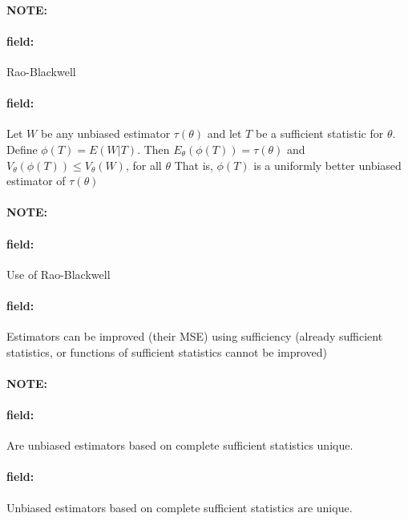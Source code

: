 \documentclass[12pt]{article}
\newenvironment{note}{\paragraph{NOTE:}}{}
\newenvironment{field}{\paragraph{field:}}{}
\begin{document}
\begin{note}
  \begin{field}
    Rao-Blackwell
  \end{field}
  \begin{field}
    Let $W$ be any unbiased estimator $\tau(\theta)$ and let $T$ be a sufficient statistic for $\theta$. Define $\phi(T) = E(W|T)$. Then $E_\theta(\phi(T)) = \tau(\theta)$ and $V_\theta(\phi(T))\leq V_\theta(W)$, for all $\theta$
    That is, $\phi(T)$ is a uniformly better unbiased estimator of $\tau(\theta)$
  \end{field}
\end{note}

\begin{note}
  \begin{field}
    Use of Rao-Blackwell
  \end{field}
  \begin{field}
    Estimators can be improved (their MSE) using sufficiency (already sufficient statistics, or functions of sufficient statistics cannot be improved)
  \end{field}
\end{note}

\begin{note}
  \begin{field}
    Are unbiased estimators based on complete sufficient statistics unique.
  \end{field}
  \begin{field}
    Unbiased estimators based on complete sufficient statistics are unique.
  \end{field}
\end{note}






\end{document}
